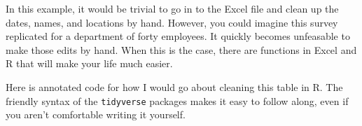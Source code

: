 \documentclass[]{book}
\newenvironment{Shaded}{\begin{snugshade}}{\end{snugshade}}
\newcommand{\KeywordTok}[1]{\textcolor[rgb]{0.13,0.29,0.53}{\textbf{#1}}}
\newcommand{\DataTypeTok}[1]{\textcolor[rgb]{0.13,0.29,0.53}{#1}}
\newcommand{\StringTok}[1]{\textcolor[rgb]{0.31,0.60,0.02}{#1}}
\newcommand{\OtherTok}[1]{\textcolor[rgb]{0.56,0.35,0.01}{#1}}
\newcommand{\OperatorTok}[1]{\textcolor[rgb]{0.81,0.36,0.00}{\textbf{#1}}}
\newcommand{\NormalTok}[1]{#1}
\begin{document}
\begin{Shaded}
\end{Shaded}

\hypertarget{htmlwidget-098b1d77ab6e7c33511b}{}

In this example, it would be trivial to go in to the Excel file and
clean up the dates, names, and locations by hand. However, you could
imagine this survey replicated for a department of forty employees. It
quickly becomes unfeasable to make those edits by hand. When this is the
case, there are functions in Excel and R that will make your life much
easier.

Here is annotated code for how I would go about cleaning this table in
R. The friendly syntax of the \texttt{tidyverse} packages makes it easy
to follow along, even if you aren't comfortable writing it yourself.
\end{document}
